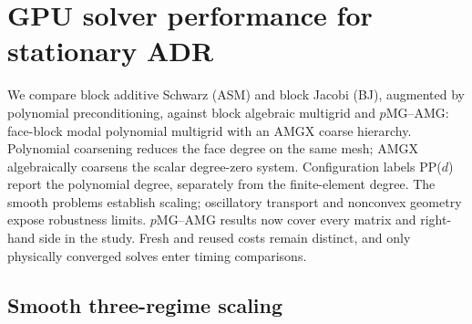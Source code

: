 \providecommand{\ADRResultsPath}{docs/research/solver_studies/adr_scaling_2026_09_17}
\providecommand{\ADRResultsFigurePath}{run_outputs/solver_studies/adr_scaling_2026_09_17/figures}
\section{GPU solver performance for stationary ADR}
\label{sec:adr-gpu-results}

We compare block additive Schwarz (ASM) and block Jacobi (BJ), augmented
by polynomial preconditioning, against block algebraic multigrid and
$p$MG--AMG: face-block modal polynomial multigrid with an AMGX coarse
hierarchy. Polynomial coarsening reduces the face degree on the same mesh;
AMGX algebraically coarsens the scalar degree-zero system. Configuration
labels PP($d$) report the polynomial degree, separately from the finite-element degree.
The smooth problems establish scaling; oscillatory transport and nonconvex
geometry expose robustness limits. $p$MG--AMG results now cover every matrix
and right-hand side in the study. Fresh and reused costs remain distinct,
and only physically converged solves enter timing comparisons.



\subsection{Smooth three-regime scaling}
\label{sec:adr-smooth-scaling}
